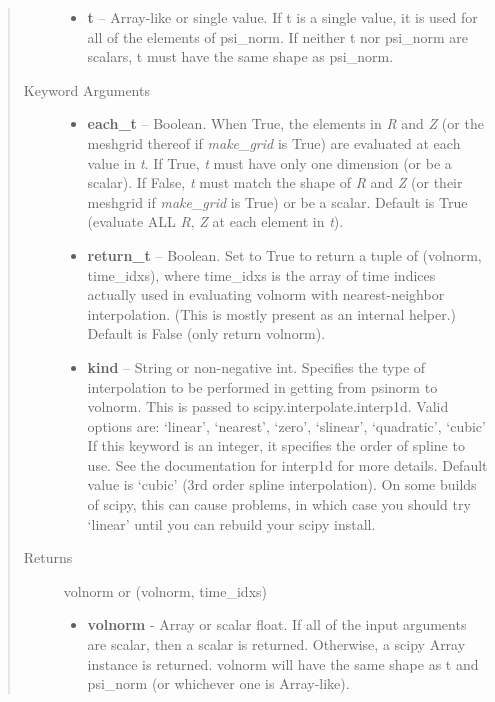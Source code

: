 \documentclass[letterpaper,10pt,english]{sphinxmanual}
\begin{document}
\begin{fulllineitems}
\begin{fulllineitems}
\begin{quote}
\begin{description}
\begin{itemize}
\item {} 
\textbf{t} --
Array-like or single value.
If t is a single value, it is used
for all of the elements of psi\_norm. If neither t nor psi\_norm
are scalars, t must have the same shape as psi\_norm.

\end{itemize}

\item[{Keyword Arguments}] \leavevmode\begin{itemize}
\item {} 
\textbf{each\_t} --
Boolean.
When True, the elements in \emph{R} and \emph{Z} (or the meshgrid thereof
if \emph{make\_grid} is True) are evaluated at each value in \emph{t}. If
True, \emph{t} must have only one dimension (or be a scalar). If
False, \emph{t} must match the shape of \emph{R} and \emph{Z} (or their
meshgrid if \emph{make\_grid} is True) or be a scalar. Default is True
(evaluate ALL \emph{R}, \emph{Z} at each element in \emph{t}).

\item {} 
\textbf{return\_t} --
Boolean.
Set to True to return a tuple of (volnorm,
time\_idxs), where time\_idxs is the array of time indices
actually used in evaluating volnorm with nearest-neighbor
interpolation. (This is mostly present as an internal helper.)
Default is False (only return volnorm).

\item {} 
\textbf{kind} --
String or non-negative int.
Specifies the type of interpolation
to be performed in getting from psinorm to volnorm. This is
passed to scipy.interpolate.interp1d. Valid options are:
`linear', `nearest', `zero', `slinear', `quadratic', `cubic'
If this keyword is an integer, it specifies the order of spline
to use. See the documentation for interp1d for more details.
Default value is `cubic' (3rd order spline interpolation). On
some builds of scipy, this can cause problems, in which case
you should try `linear' until you can rebuild your scipy install.

\end{itemize}

\item[{Returns}] \leavevmode

volnorm or (volnorm, time\_idxs)
\begin{itemize}
\item {} 
\textbf{volnorm} - Array or scalar float. If all of the input arguments are
scalar, then a scalar is returned. Otherwise, a scipy Array
instance is returned. volnorm will have the same shape as t and
psi\_norm (or whichever one is Array-like).


\end{itemize}
\end{description}
\end{quote}
\end{fulllineitems}
\end{fulllineitems}
\end{document}
